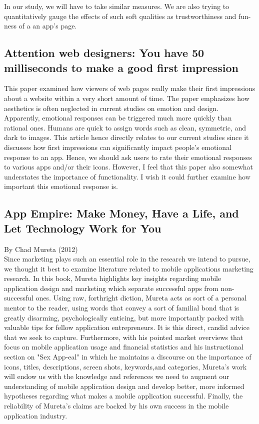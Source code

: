 \documentclass{article}
\begin{document}
In our study, we will have to take similar measures. We are also trying to quantitatively gauge the effects of such soft qualities as trustworthiness and fun-ness of a an app's page.

\subsection{Attention web designers: You have 50 milliseconds to make a good
ﬁrst impression}

This paper examined how viewers of web pages really make their first impressions about a website within a very short amount of time. The paper emphasizes how aesthetics is often neglected in current studies on emotion and design. Apparently, emotional responses can be triggered much more quickly than rational ones. Humans are quick to assign words such as clean, symmetric, and dark to images. This article hence directly relates to our current studies since it discusses how first impressions can significantly impact people's emotional response to an app. Hence, we should ask users to rate their emotional responses to various apps and/or their icons. However, I feel that this paper also somewhat understates the importance of functionality. I wish it could further examine how important this emotional response is.

\subsection{App Empire: Make Money, Have a Life, and Let Technology Work for You}

By Chad Mureta (2012) \\

Since marketing plays such an essential role in the research we intend to pursue, we thought it best to examine literature related to mobile applications marketing research. In this book, Mureta highlights key insights regarding mobile application design and marketing which separate successful apps from non-successful ones.  Using raw, forthright diction, Mureta acts as sort of a personal mentor to the reader, using words that convey a sort of familial bond that is greatly disarming, psychologically enticing, but more importantly packed with valuable tips for fellow application entrepreneurs.  It is this direct, candid advice that we seek to capture.  Furthermore, with his pointed market overviews that focus on mobile application usage and financial statistics and his instructional section on "Sex App-eal" in which he maintains a discourse on the importance of icons, titles, descriptions, screen shots, keywords,and categories, Mureta's work will endow us with the knowledge and references we need to augment our understanding of mobile application design and develop better, more informed hypotheses regarding what makes a mobile application successful. Finally, the reliability of Mureta's claims are backed by his own success in the mobile application industry.\cite {mureta} \\
\end{document}
